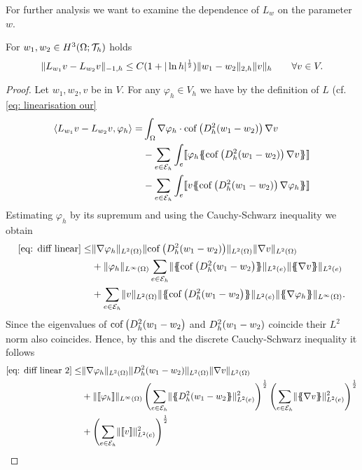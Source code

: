 For further analysis we want to examine the dependence of $L_w$ on the parameter $w$.
\begin{lemma}\label{la: L dependence paramter}
	For $w_1, w_2 \in H^3(\Omega; \mathcal{T}_h)$ holds
	\[
		\lVert L_{w_1} v - L_{w_2} v \rVert_{-1,h} \leq C (1+|\ln h|^{\frac 1 2})\lVert w_1 - w_2 \rVert_{2,h} \lVert v \rVert_{h} \qquad \forall v \in V. 
	\]
\end{lemma}
\begin{proof}
	Let $w_1, w_2, v$ be in $V$. For any $\varphi_h \in V_h$ we have by the definition of $L$ (cf. \eqref{eq: linearisation our}
	\begin{align}
		\bilin{L_{w_1}v- L_{w_2} v} {\varphi_h} =  
			&\int_{\Omega} \nabla \varphi_h \cdot \cofHessH{(w_1-w_2)} \nabla v  \nonumber\\
			& -\sum\limits_{e \in \edges}\int_{e} \jump {\varphi_h \average { \cofHessH{(w_1-w_2)} \nabla v} } \nonumber \\
			& - \sum\limits_{e \in \edges}\int_{e} \jump {v \average{ \cofHessH{(w_1-w_2)} \nabla \varphi_h} } \label{eq: diff linear}
	\end{align}
	Estimating $\varphi_h$ by its supremum and using the Cauchy-Schwarz inequality we obtain
	\begin{align}
		\eqref{eq: diff linear}
		\leq& \LTwonorm{\nabla \varphi_h} \LTwonorm{\cofHessH{(w_1 -w_2)}} \LTwonorm {\nabla v} \nonumber \\
			&+ \LInftynorm{\varphi_h} \sum_{e \in \edges} \LTwonormE{\average{\cofHessH{(w_1-w_2}}} \LTwonormE{\average{\nabla v}} \nonumber \\
			&+ \sum_{e \in \edges} \LTwonorm{v} \LTwonormE{\average{\cofHessH{(w_1-w_2}}} \LInftynorm{\average{\nabla \varphi_h}}.\label{eq: diff linear 2}
	\end{align}
	Since the eigenvalues of $\operatorname{cof} \left( D_h^2 (w_1-w_2 \right)$ and $D_h^2 (w_1-w_2)$ coincide their $L^2$ norm also coincides. Hence, by this and the discrete Cauchy-Schwarz inequality it follows
	\begin{align}
		\eqref{eq: diff linear 2} %
		\leq& \LTwonorm{\nabla \varphi_h} \LTwonorm{\hess{(w_1 -w_2)}} \LTwonorm {\nabla v} \nonumber \\
			&+ \LInftynorm{\jump {\varphi_h}} 
				\left(\sum_{e \in \edges} \LTwonormE{\average{\hess{(w_1-w_2}}}^2 \right)^{\frac 1 2} 
				\left(\sum_{e \in \edges} \LTwonormE{\average{\nabla v}}^2 \right)^{\frac 1 2} \nonumber \\
			&+ 	\left(\sum_{e \in \edges} \LTwonormE{\jump v}^2 \right)^{\frac 1 2} 

\end{align}
\end{proof}

